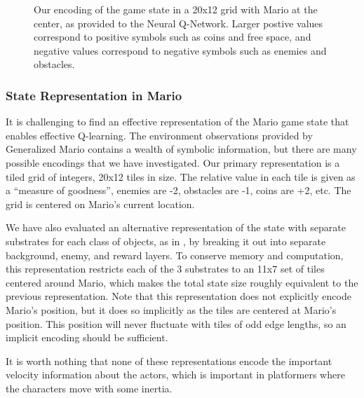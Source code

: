\documentclass{article}
\begin{document}
\begin{figure}
\begin{center}
\caption{Our encoding of the game state in a 20x12 grid with Mario at the center, as provided to the Neural Q-Network. Larger postive values correspond to positive symbols such as coins and free space, and negative values correspond to negative symbols such as enemies and obstacles.}
\end{center}
\end{figure}

\subsubsection{State Representation in Mario}
It is challenging to find an effective representation of the Mario game state that enables effective Q-learning. The environment observations provided by Generalized Mario contains a wealth of symbolic information, but there are many possible encodings that we have investigated. Our primary representation is a tiled grid of integers, 20x12 tiles in size. The relative value in each tile is given as a ``measure of goodness'', enemies are -2, obstacles are -1, coins are +2, etc. The grid is centered on Mario's current location. 

We have also evaluated an alternative representation of the state with separate substrates for each class of objects, as in \cite{Hauskneck13}, by breaking it out into separate background, enemy, and reward layers. To conserve memory and computation, this representation restricts each of the 3 substrates to an 11x7 set of tiles centered around Mario, which makes the total state size roughly equivalent to the previous representation. Note that this representation does not explicitly encode Mario's position, but it does so implicitly as the tiles are centered at Mario's position. This position will never fluctuate with tiles of odd edge lengths, so an implicit encoding should be sufficient.

It is worth nothing that none of these representations encode the important velocity information about the actors, which is important in platformers where the characters move with some inertia.
\end{document}
